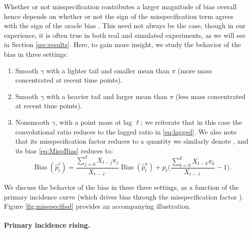 \documentclass{article}
\renewcommand{\hat}{\widehat} %
\DeclareMathOperator{\bias}{Bias}
\begin{document}
Whether or not misspecification contributes a larger magnitude of bias overall
hence depends on whether or not the sign of the misspecification term  agrees with the sign of the oracle bias
\smash{$\bias(\hat{p}_t^\pi)$}. This need not always be the case, though in our
experience, it is often true in both real and simulated experiments, as we will
see in Section \ref{sec:results}. Here, to gain more insight, we study the
behavior of the bias in three settings: 
\begin{enumerate} 
\item Smooth $\gamma$ with a lighter tail and smaller mean than $\pi$ (more mass
  concentrated at recent time points).    
\item Smooth $\gamma$ with a heavier tail and larger mean than $\pi$ (less mass
  concentrated at recent time points).    
\item Nonsmooth $\gamma$, with a point mass at lag $\ell$; we reiterate that in 
  this case the convolutional ratio reduces to the lagged ratio
  \smash{$\hat{p}_t^\ell$} in \eqref{eq:lagged}. We also note that its
  misspecification factor  reduces to a quantity we
  similarly denote , and its bias \eqref{eq:MispBias} reduces to: 
  \begin{equation}
  \label{eq:LagBias}
  \bias(\hat{p}_t^\ell) = \frac{\sum_{j=0}^d X_{t-j}\pi_j}{X_{t-\ell}}
  \bias(\hat{p}_t^\pi) + p_t \Bigg(\frac{\sum_{k=0}^d X_{t-k}\pi_k}{X_{t-\ell}}
  - 1 \Bigg).  
\end{equation}
\end{enumerate}

We discuss the behavior of the bias in these three settings, as a function of
the primary incidence curve (which drives bias through the misspecification
factor ). Figure \ref{fig:misspecified} provides an
accompanying illustration.

\paragraph{Primary incidence rising.} 
\end{document}
